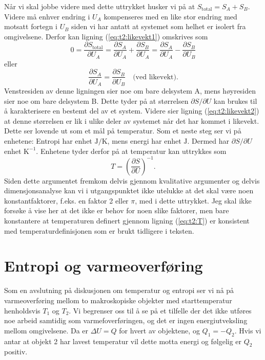Når vi skal jobbe videre med dette uttrykket husker vi på at $S_\text{total} = S_A + S_B$. Videre må enhver endring i $U_A$ kompenseres med en like stor endring med motsatt fortegn i $U_B$ siden vi har antatt at systemet som helhet er isolert fra omgivelsene. Derfor kan ligning (\ref{eq:t2:likevekt1}) omskrives som
\begin{displaymath}
	0 = \frac{\partial S_\text{total}}{\partial U_A} = \frac{\partial S_A}{\partial U_A} + \frac{\partial S_B}{\partial U_A}
	 = \frac{\partial S_A}{\partial U_A} - \frac{\partial S_B}{\partial U_B}
\end{displaymath}
eller
\begin{displaymath}
	\frac{\partial S_A}{\partial U_A} = \frac{\partial S_B}{\partial U_B} \quad \text{(ved likevekt)}.
	\label{eq:t2:likevekt2}
\end{displaymath}
Venstresiden av denne ligningen sier noe om bare delsystem A, mens høyre\-siden sier noe om bare delsystem B. Dette tyder på at størrelsen $\partial S/\partial U$ kan brukes til å karakterisere en bestemt del av et system. Videre sier ligning (\ref{eq:t2:likevekt2}) at denne størrelsen er lik i ulike deler av systemet når det har kommet i likevekt. Dette ser lovende ut som et mål på temperatur. Som et neste steg ser vi på enhetene: Entropi har enhet $\mathrm{J/K}$, mens energi har enhet $\mathrm{J}$. Dermed har $\partial S/\partial U$ enhet $\mathrm{K^{-1}}$. Enhetene tyder derfor på at temperatur kan uttrykkes som 
\begin{equation}
	T = \left(\frac{\partial S}{\partial U}\right)^{-1}.
	\label{eq:t2:T}
\end{equation}
Siden dette argumentet fremkom delvis gjennom kvalitative argumenter og delvis dimensjonsanalyse kan vi i utgangspunktet ikke utelukke at det skal være noen konstantfaktorer, f.eks. en faktor 2 eller $\pi$, med i dette uttrykket. Jeg skal ikke forsøke å vise her at det ikke er behov for noen slike faktorer, men bare konstantere at temperaturen definert gjennom ligning (\ref{eq:t2:T}) er konsistent med temperaturdefinisjonen som er brukt tidligere i teksten.

\section{Entropi og varmeoverføring}
Som en avslutning på diskusjonen om temperatur og entropi ser vi nå på varmeoverføring mellom to makroskopiske objekter med starttemperatur henholdsvis $T_1$ og $T_2$. Vi begrenser oss til å se på et tilfelle der det ikke utføres noe arbeid samtidig som varmefoverføringen, og det er ingen energiutveksling mellom omgivelsene. Da er $\Delta U = Q$ for hvert av objektene, og $Q_1 = -Q_2$. Hvis vi antar at objekt 2 har lavest temperatur vil dette motta energi og følgelig er $Q_2$ positiv.

